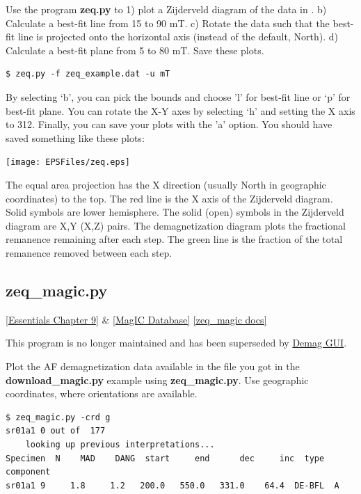 \documentclass[11pt]{book}
\begin{document}
{{{Use the program {\bf zeq.py} to 1) plot a Zijderveld diagram of the data in .  b) Calculate a best-fit line from 15 to 90 mT.  c) Rotate the data such that the best-fit line is projected onto the horizontal axis (instead of the default, North).   d) Calculate a best-fit plane from 5 to 80 mT.  Save these plots.


\begin{verbatim}
$ zeq.py -f zeq_example.dat -u mT
\end{verbatim}

 By selecting `b', you can pick the bounds and choose 'l' for best-fit line or  `p' for best-fit plane.  You can rotate the X-Y axes  by selecting `h' and setting the X axis to 312.   Finally, you can save your plots with the 'a' option.   You should have saved something like these plots:

{ %
\texttt{[image: EPSFiles/zeq.eps]}}

The equal area projection has the X direction (usually North in geographic coordinates)
          to the top.  The red line is the X axis of the Zijderveld diagram.  Solid symbols are lower hemisphere.
          The solid (open) symbols in the Zijderveld diagram are X,Y (X,Z) pairs.  The demagnetization diagram plots the
          fractional remanence remaining after each step. The green line is the fraction of the total remanence removed
          between each step.





\subsection{zeq\_magic.py}
\href{http://earthref.org/MAGIC/books/Tauxe/Essentials/WebBook3ch9.html#ch9}{[Essentials Chapter 9]}  \& \href{#MagICDatabase}{[MagIC Database]}
\href{https://github.com/PmagPy/PmagPy/blob/master/programs/zeq_magic.py}{[zeq\_magic docs]}

This program is no longer maintained and has been superseded by \href{#demag_gui.py}{Demag GUI}.

Plot the AF demagnetization data available in the file you got in the {\bf download\_magic.py} example using {\bf zeq\_magic.py}.    Use geographic coordinates, where orientations are available.

\begin{verbatim}
$ zeq_magic.py -crd g
sr01a1 0 out of  177
    looking up previous interpretations...
Specimen  N    MAD    DANG  start     end      dec     inc  type  component
sr01a1 9     1.8     1.2   200.0   550.0   331.0    64.4  DE-BFL  A


\end{verbatim}}}}
\end{document}

